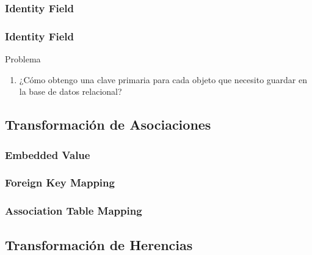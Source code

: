 \documentclass[a4paper,slidestop,xcolor=pst,blue]{beamer}
\begin{document}
\subsubsection{Identity Field}

\begin{frame}[c]
    \frametitle{Identity Field}
    \begin{block}{Problema}
        \begin{enumerate}
            \item ¿Cómo obtengo una clave primaria para cada objeto que necesito guardar en la base de datos relacional?
        \end{enumerate}
    \end{block}
\end{frame}

\subsection{Transformación de Asociaciones}

\subsubsection{Embedded Value}

\subsubsection{Foreign Key Mapping}

\subsubsection{Association Table Mapping}

\subsection{Transformación de Herencias}
\end{document}
